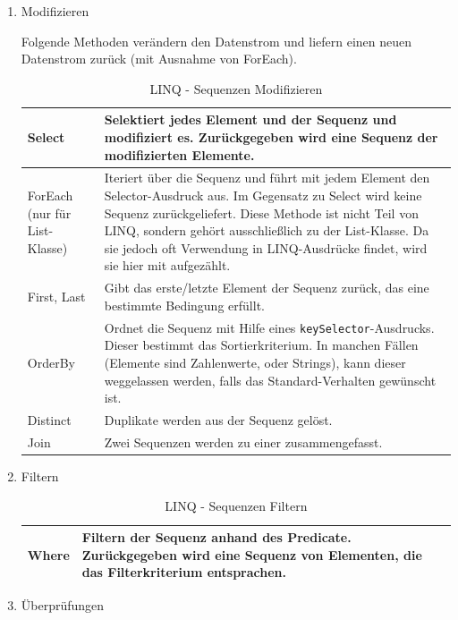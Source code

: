 \begin{enumerate}
\item Modifizieren

Folgende Methoden verändern den Datenstrom und liefern einen neuen Datenstrom
zurück (mit Ausnahme von ForEach).

\bigskip
\begin{table}[H]
	\centering
\begin{tabularx}{\textwidth}{|p{130 pt}|X|}
		\hline
Select & Selektiert jedes Element und der Sequenz und modifiziert es. Zurückgegeben wird eine Sequenz der modifizierten Elemente.\\	\hline
ForEach (nur für List-Klasse) & Iteriert über die Sequenz und führt mit jedem Element den Selector-Ausdruck aus. Im Gegensatz zu Select wird keine Sequenz zurückgeliefert. Diese Methode ist nicht Teil von LINQ, sondern gehört ausschließlich zu der List-Klasse. Da sie jedoch oft Verwendung in LINQ-Ausdrücke findet, wird sie hier mit aufgezählt.\\	\hline
First,  Last & Gibt das erste/letzte Element der Sequenz zurück, das eine bestimmte Bedingung erfüllt.\\	\hline
OrderBy & Ordnet die Sequenz mit Hilfe eines \texttt{keySelector}-Ausdrucks. Dieser bestimmt das Sortierkriterium. In manchen Fällen (Elemente sind Zahlenwerte, oder Strings), kann dieser weggelassen werden, falls das Standard-Verhalten gewünscht ist.\\	\hline
Distinct & Duplikate werden aus der Sequenz gelöst.\\	\hline
Join & Zwei Sequenzen werden zu einer zusammengefasst.\\	\hline
\end{tabularx}
	\medskip
	\caption{LINQ - Sequenzen Modifizieren}
\end{table}


\item Filtern

\bigskip

\begin{table}[H]
	\centering
\begin{tabularx}{\textwidth}{|p{130 pt}|X|}
		\hline
Where & Filtern der Sequenz anhand des Predicate. Zurückgegeben wird eine Sequenz von Elementen, die das Filterkriterium entsprachen.\\	\hline
\end{tabularx}
	\medskip
	\caption{LINQ - Sequenzen Filtern}
\end{table}

\item Überprüfungen


\end{enumerate}
